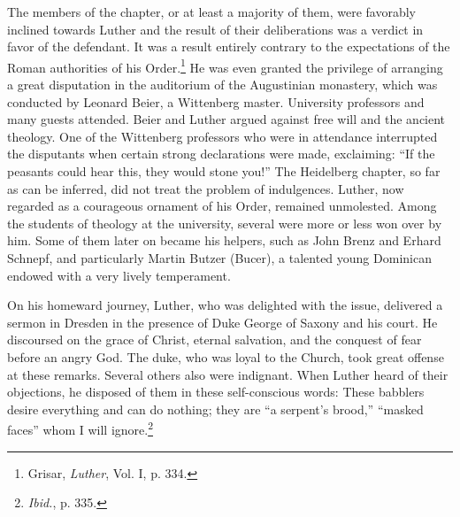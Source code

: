 The members of the chapter, or at least a majority of them, were
favorably inclined towards Luther and the result of their deliberations
was a verdict in favor of the defendant. It was a result entirely
contrary to the expectations of the Roman authorities of his
Order.\footnote{Grisar, \textit{Luther}, Vol. I, p. 334.}
He was even granted the privilege of arranging a great
disputation in the auditorium of the Augustinian monastery, which
was conducted by Leonard Beier, a Wittenberg master. University
professors and many guests attended. Beier and Luther argued against
free will and the ancient theology. One of the Wittenberg professors who
were in attendance interrupted the disputants when certain
strong declarations were made, exclaiming: “If the peasants could
hear this, they would stone you!” The Heidelberg chapter, so far as
can be inferred, did not treat the problem of indulgences. Luther,
now regarded as a courageous ornament of his Order, remained
unmolested. Among the students of theology at the university, several were
more or less won over by him. Some of them later on became
his helpers, such as John Brenz and Erhard Schnepf, and particularly
Martin Butzer (Bucer), a talented young Dominican endowed with a
very lively temperament.

On his homeward journey, Luther, who was delighted with the
issue, delivered a sermon in Dresden in the presence of Duke George
of Saxony and his court. He discoursed on the grace of Christ, eternal
salvation, and the conquest of fear before an angry God. The duke,
who was loyal to the Church, took great offense at these remarks.
Several others also were indignant. When Luther heard of their objections,
he disposed of them in these self-conscious words: These
babblers desire everything and can do nothing; they are “a serpent’s
brood,” “masked faces” whom I will ignore.\footnote{\textit{Ibid.}, p. 335.}

